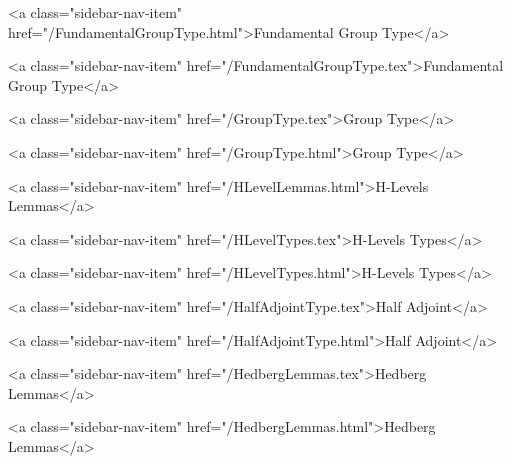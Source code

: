       
        
          <a class="sidebar-nav-item" href="/FundamentalGroupType.html">Fundamental Group Type</a>
        
      
    
      
        
          <a class="sidebar-nav-item" href="/FundamentalGroupType.tex">Fundamental Group Type</a>
        
      
    
      
        
          <a class="sidebar-nav-item" href="/GroupType.tex">Group Type</a>
        
      
    
      
        
          <a class="sidebar-nav-item" href="/GroupType.html">Group Type</a>
        
      
    
      
        
          <a class="sidebar-nav-item" href="/HLevelLemmas.html">H-Levels Lemmas</a>
        
      
    
      
        
          <a class="sidebar-nav-item" href="/HLevelTypes.tex">H-Levels Types</a>
        
      
    
      
        
          <a class="sidebar-nav-item" href="/HLevelTypes.html">H-Levels Types</a>
        
      
    
      
        
          <a class="sidebar-nav-item" href="/HalfAdjointType.tex">Half Adjoint</a>
        
      
    
      
        
          <a class="sidebar-nav-item" href="/HalfAdjointType.html">Half Adjoint</a>
        
      
    
      
        
          <a class="sidebar-nav-item" href="/HedbergLemmas.tex">Hedberg Lemmas</a>
        
      
    
      
        
          <a class="sidebar-nav-item" href="/HedbergLemmas.html">Hedberg Lemmas</a>
        
